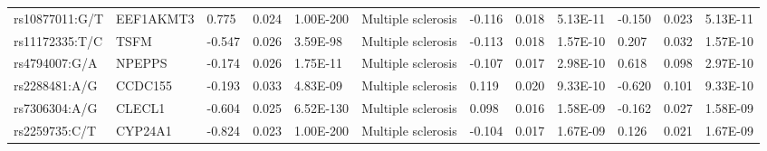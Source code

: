 \begin{table}[]
{\begin{tabular}{llllllllllll}
		\rowcolor[HTML]{BEBEBE}rs10877011:G/T                   & EEF1AKMT3                         & 0.775                             & 0.024                           & 1.00E-200                      & Multiple sclerosis                         & -0.116                            & 0.018                           & 5.13E-11                       & -0.150                          & 0.023                           & 5.13E-11                       \\
		\rowcolor[HTML]{BEBEBE}rs11172335:T/C                   & TSFM                              & -0.547                            & 0.026                           & 3.59E-98                       & Multiple sclerosis                         & -0.113                            & 0.018                           & 1.57E-10                       & 0.207                           & 0.032                           & 1.57E-10                       \\
		\rowcolor[HTML]{BEBEBE}rs4794007:G/A                    & NPEPPS                            & -0.174                            & 0.026                           & 1.75E-11                       & Multiple sclerosis                         & -0.107                            & 0.017                           & 2.98E-10                       & 0.618                           & 0.098                           & 2.97E-10                       \\
		\rowcolor[HTML]{BEBEBE}rs2288481:A/G                    & CCDC155                           & -0.193                            & 0.033                           & 4.83E-09                       & Multiple sclerosis                         & 0.119                             & 0.020                           & 9.33E-10                       & -0.620                          & 0.101                           & 9.33E-10                       \\
		\rowcolor[HTML]{BEBEBE}rs7306304:A/G                    & CLECL1                            & -0.604                            & 0.025                           & 6.52E-130                      & Multiple sclerosis                         & 0.098                             & 0.016                           & 1.58E-09                       & -0.162                          & 0.027                           & 1.58E-09                       \\
		\rowcolor[HTML]{BEBEBE}rs2259735:C/T                    & CYP24A1                           & -0.824                            & 0.023                           & 1.00E-200                      & Multiple sclerosis                         & -0.104                            & 0.017                           & 1.67E-09                       & 0.126                           & 0.021                           & 1.67E-09                       \\

\end{tabular}}
\end{table}
